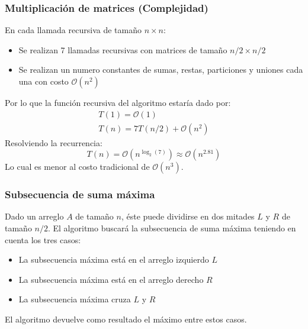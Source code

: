\documentclass[10pt]{beamer}
\begin{document}
    \begin{frame}
        \frametitle{Multiplicación de matrices (Complejidad)}
        En cada llamada recursiva de tamaño $n \times n$:
        \begin{itemize}
            \item Se realizan 7 llamadas recursivas con matrices de tamaño $n/2\times n/2$
            \item Se realizan un numero constantes de sumas, restas, particiones y uniones cada una con costo $\mathcal{O}(n^2)$
        \end{itemize}
        Por lo que la función recursiva del algoritmo estaría dado por:
        \begin{gather*}
            T(1) = \mathcal{O}(1) \\
            T(n) = 7T(n/2) + \mathcal{O}(n^2)
        \end{gather*}
        Resolviendo la recurrencia:
        \begin{equation*}
            T(n) = \mathcal{O}(n^{\log_2(7)}) \approx \mathcal{O}(n^{2.81})
        \end{equation*}
        Lo cual es menor al costo tradicional de $\mathcal{O}(n^3)$.
    \end{frame}

    \begin{frame}
        \frametitle{Subsecuencia de suma máxima}
        Dado un arreglo $A$ de tamaño $n$, éste puede dividirse en dos mitades $L$ y $R$ de tamaño $n/2$. 
        El algoritmo buscará la subsecuencia de suma máxima teniendo en cuenta los tres casos:
        \begin{itemize}
            \item La subsecuencia máxima está en el arreglo izquierdo $L$
            \item La subsecuencia máxima está en el arreglo derecho $R$
            \item La subsecuencia máxima cruza $L$ y $R$
        \end{itemize}
        El algoritmo devuelve como resultado el máximo entre estos casos.
    \end{frame}
\end{document}
